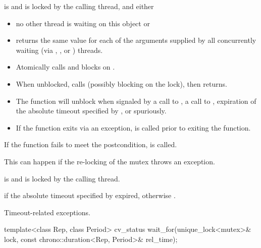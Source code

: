 \begin{itemdescr}
\pnum
\expects
{} is  and 
is locked by the calling thread, and either
\begin{itemize}
\item no other thread is waiting on this  object or
\item {} returns the same value for each of the 
arguments supplied by all concurrently waiting (via ,
, or ) threads.
\end{itemize}

\pnum
\effects
\begin{itemize}
\item
Atomically calls  and blocks on .

\item
When unblocked, calls  (possibly blocking on the lock), then returns.

\item
The function will unblock when signaled by a call to , a call to ,
expiration of the absolute timeout specified by ,
or spuriously.

\item
If the function exits via an exception,  is called prior to exiting the function.
\end{itemize}

\pnum
\remarks
If the function fails to meet the postcondition, 
is called.
\begin{note}
This can happen if the re-locking of the mutex throws an exception.
\end{note}

\pnum
\ensures
{} is  and 
is locked by the calling thread.

\pnum
\returns
{} if
the absolute timeout specified by  expired,
otherwise .

\pnum
\throws
Timeout-related
exceptions.
\end{itemdescr}

%
\begin{itemdecl}
template<class Rep, class Period>
  cv_status wait_for(unique_lock<mutex>& lock,
                     const chrono::duration<Rep, Period>& rel_time);
\end{itemdecl}

